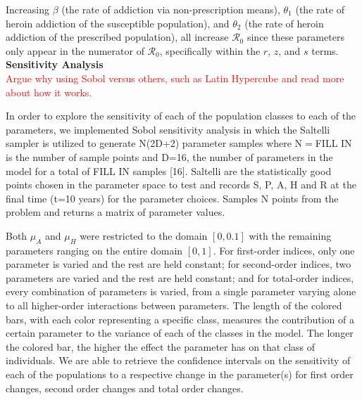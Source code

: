 \documentclass[12pt]{article}
\begin{document}
Increasing $\beta$ (the rate of addiction via non-prescription means), $\theta_1$ (the rate of heroin addiction of the susceptible population), and $\theta_2$ (the rate of heroin addiction of the prescribed population), all increase $\mathscr{R}_0$ since these parameters only appear in the numerator of $\mathscr{R}_0$, specifically within the $r$, $z$, and $s$ terms. \\ 

\textbf{Sensitivity Analysis} \\
\textcolor{red}{Argue why using Sobol versus others, such as Latin Hypercube and read more about how it works.} 

In order to explore the sensitivity of each of the population classes to each of the parameters, we implemented Sobol sensitivity analysis in which the Saltelli sampler is utilized to generate N(2D+2) parameter samples where N$=$FILL IN is the number of sample points and D=16, the number of parameters in the model for a total of FILL IN samples [16]. 
Saltelli are the statistically good points chosen in the parameter space to test and records S, P, A, H and R at the final time (t=10 years) for the parameter choices. Samples N points from the problem and returns a matrix of parameter values. 

Both $\mu_{A}$ and $\mu_{H}$ were restricted to the domain $[0,0.1]$ with the remaining parameters ranging on the entire domain $[0,1]$. For first-order indices, only one parameter is varied and the rest are held constant; for second-order indices, two parameters are varied and the rest are held constant; and for total-order indices, every combination of parameters is varied, from a single parameter varying alone to all higher-order interactions between parameters. The length of the colored bars, with each color representing a specific class, measures the contribution of a certain parameter to the variance of each of the classes in the model. The longer the colored bar, the higher the effect the parameter has on that class of individuals. We are able to retrieve the confidence intervals on the sensitivity of each of the populations to a respective change in the parameter(s) for first order changes, second order changes and total order changes. \\

\end{document}
